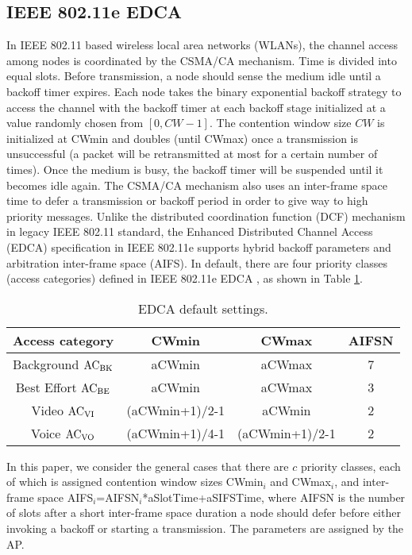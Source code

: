 \documentclass[conference]{IEEEtran}
\begin{document}
\subsection{IEEE 802.11e EDCA}
In IEEE 802.11 based wireless local area networks (WLANs), the channel access among nodes is coordinated by the CSMA/CA mechanism. Time is divided into equal slots. Before transmission, a node should sense the medium idle until a backoff timer expires. Each node takes the binary exponential backoff strategy to access the channel with the backoff timer at each backoff stage initialized at a value randomly chosen from $[0,CW-1]$. The contention window size $CW$ is initialized at CWmin and doubles (until CWmax) once a transmission is unsuccessful (a packet will be retransmitted at most for a certain number of times). Once the medium is busy, the backoff timer will be suspended until it becomes idle again. The CSMA/CA mechanism also uses an inter-frame space time to defer a transmission or backoff period in order to give way to high priority messages. Unlike the distributed coordination function (DCF) mechanism in legacy IEEE 802.11 standard, the Enhanced Distributed Channel Access (EDCA) specification in IEEE 802.11e supports hybrid backoff parameters and arbitration inter-frame space (AIFS). In default, there are four priority classes (access categories) defined in IEEE 802.11e EDCA \cite{standards2005wireless}, as shown in Table \ref{Table:EDCA}.
\begin{table}[ht]
\centering
\label{Table:EDCA}
\caption{EDCA default settings.}
\begin{tabular}{|c|c|c|c|}
  \hline
    \textbf{Access category}	& \textbf{CWmin}	& \textbf{CWmax}	& \textbf{AIFSN} \\
  \hline
    Background $\rm{AC}_{\rm{BK}}$	& {aCWmin}	& {aCWmax}	& 7 \\
    Best Effort $\rm{AC}_{\rm{BE}}$ & {aCWmin} & {aCWmax}	& 3 \\
    Video $\rm{AC}_{\rm{VI}}$	& ({aCWmin}+1)/2-1	& {aCWmin}	& 2 \\
    Voice $\rm{AC}_{\rm{VO}}$	& ({aCWmin}+1)/4-1	& ({aCWmin}+1)/2-1	& 2 \\
  \hline
\end{tabular}
\vspace{-2mm}
\end{table}

In this paper, we consider the general cases that there are $c$ priority classes, each of which is assigned contention window sizes CWmin$_i$ and CWmax$_i$, and inter-frame space AIFS$_i$=AIFSN$_i$*aSlotTime+aSIFSTime, where AIFSN is the number of slots after a short inter-frame space duration a node should defer before either invoking a backoff or starting a transmission. The parameters are assigned by the AP.
\end{document}
